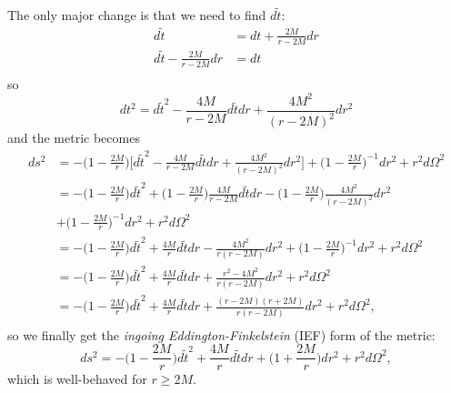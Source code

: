 \documentclass[12pt]{article}
\numberwithin{equation}{section}
\begin{document}
The only major change is that we need to find $d \tilde{t}$:
\begin{equation*}
\begin{aligned}
d\tilde{t} &= dt + \frac{2 M}{r - 2 M} dr \\
d\tilde{t} - \frac{2 M}{r - 2 M} dr &= dt \\
\end{aligned}
\end{equation*}
so
\begin{equation*}
dt^2 = d\tilde{t}^2 - \frac{4 M}{r - 2 M} d\tilde{t} dr + \frac{4 M^2}{(r - 2 M)^2} dr^2
\end{equation*}
and the metric becomes
\begin{equation*}
\begin{aligned}
ds^2 &= - \Big( 1 - \frac{2 M}{r} \Big) \Big[ d\tilde{t}^2 - \frac{4 M}{r - 2 M} d\tilde{t} dr + \frac{4 M^2}{(r - 2 M)^2} dr^2 \Big] + \Big(1 - \frac{2 M}{r} \Big)^{-1} dr^2 + r^2 d\Omega^2 \\
&= - \Big( 1 - \frac{2 M}{r} \Big) d\tilde{t}^2 + \Big( 1 - \frac{2 M}{r} \Big) \frac{4 M}{r - 2 M} d\tilde{t} dr - \Big( 1 - \frac{2 M}{r} \Big) \frac{4 M^2}{(r - 2 M)^2} dr^2 \\
&+ \Big(1 - \frac{2 M}{r} \Big)^{-1} dr^2 + r^2 d\Omega^2 \\
&= - \Big( 1 - \frac{2 M}{r} \Big) d\tilde{t}^2 + \frac{4 M}{r} d\tilde{t} dr - \frac{4 M^2}{r (r - 2 M)} dr^2 + \Big(1 - \frac{2 M}{r} \Big)^{-1} dr^2 + r^2 d\Omega^2 \\
&= - \Big( 1 - \frac{2 M}{r} \Big) d\tilde{t}^2 + \frac{4 M}{r} d\tilde{t} dr + \frac{r^2 - 4 M^2}{r(r - 2M)} dr^2 + r^2 d\Omega^2 \\
&= - \Big( 1 - \frac{2 M}{r} \Big) d\tilde{t}^2 + \frac{4 M}{r} d\tilde{t} dr + \frac{(r - 2 M) (r + 2 M)}{r(r - 2M)} dr^2 + r^2 d\Omega^2, \\
\end{aligned}
\end{equation*}
so we finally get the \textit{ingoing Eddington-Finkelstein} (IEF) form of the metric:
\begin{equation} \label{eq:IEF_metric}
ds^2 = - \Big( 1 - \frac{2 M}{r} \Big) d\tilde{t}^2 + \frac{4 M}{r} d\tilde{t} dr + \Big( 1 + \frac{2 M}{r} \Big) dr^2 + r^2 d\Omega^2,
\end{equation}
which is well-behaved for $r \geq 2 M$.
\end{document}
